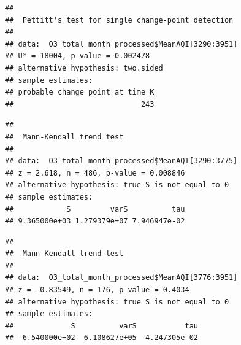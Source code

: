 \documentclass[12pt,]{article}
\newenvironment{Shaded}{\begin{snugshade}}{\end{snugshade}}
\newcommand{\KeywordTok}[1]{\textcolor[rgb]{0.13,0.29,0.53}{\textbf{#1}}}
\newcommand{\DecValTok}[1]{\textcolor[rgb]{0.00,0.00,0.81}{#1}}
\newcommand{\CommentTok}[1]{\textcolor[rgb]{0.56,0.35,0.01}{\textit{#1}}}
\newcommand{\OperatorTok}[1]{\textcolor[rgb]{0.81,0.36,0.00}{\textbf{#1}}}
\newcommand{\NormalTok}[1]{#1}
\begin{document}
\begin{Shaded}
\end{Shaded}

\begin{verbatim}
## 
##  Pettitt's test for single change-point detection
## 
## data:  O3_total_month_processed$MeanAQI[3290:3951]
## U* = 18004, p-value = 0.002478
## alternative hypothesis: two.sided
## sample estimates:
## probable change point at time K 
##                             243
\end{verbatim}

\begin{Shaded}
\end{Shaded}

\begin{verbatim}
## 
##  Mann-Kendall trend test
## 
## data:  O3_total_month_processed$MeanAQI[3290:3775]
## z = 2.618, n = 486, p-value = 0.008846
## alternative hypothesis: true S is not equal to 0
## sample estimates:
##            S         varS          tau 
## 9.365000e+03 1.279379e+07 7.946947e-02
\end{verbatim}

\begin{Shaded}
\end{Shaded}

\begin{verbatim}
## 
##  Mann-Kendall trend test
## 
## data:  O3_total_month_processed$MeanAQI[3776:3951]
## z = -0.83549, n = 176, p-value = 0.4034
## alternative hypothesis: true S is not equal to 0
## sample estimates:
##             S          varS           tau 
## -6.540000e+02  6.108627e+05 -4.247305e-02
\end{verbatim}
\end{document}
